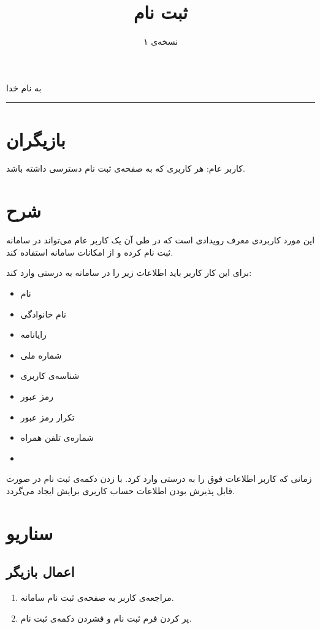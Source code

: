\documentclass[a4paper]{article}
\title{\textbf{ثبت‌ نام}}
\author{نسخه‌ی ۱}
\date{}
\begin{document}
\begin{center}
به نام خدا
\end{center}
{\let\newpage\relax\maketitle}
\maketitle
\rule{\textwidth}{2pt}
\section{بازیگران}
کاربر عام: هر کاربری که به صفحه‌ی ثبت‌ نام دسترسی داشته باشد. 
\section{شرح}
این مورد کاربردی معرف رویدادی است که در طی آن یک کاربر عام می‌تواند در سامانه ثبت نام کرده و از امکانات سامانه استفاده کند.

برای این کار کاربر باید اطلاعات زیر را در سامانه به درستی وارد کند:
\begin{itemize}
\item
نام
\item
نام خانوادگی
\item
رایانامه
\item
شماره ملی
\item
شناسه‌ی کاربری
\item
رمز عبور
\item
تکرار رمز عبور
\item
شماره‌ی تلفن همراه
\item
{}
\end{itemize}
زمانی که کاربر اطلاعات فوق را به درستی وارد کرد. با زدن دکمه‌ی ثبت نام در صورت قابل پذیرش بودن اطلاعات حساب کاربری برایش ایجاد می‌گردد.
\section{سناریو}
\subsection{اعمال بازیگر}
\begin{enumerate}
\item
مراجعه‌ی کاربر به صفحه‌ی ثبت نام سامانه.
\item
پر کردن فرم ثبت نام و فشردن دکمه‌ی ثبت نام.
\end{enumerate}
\end{document}
